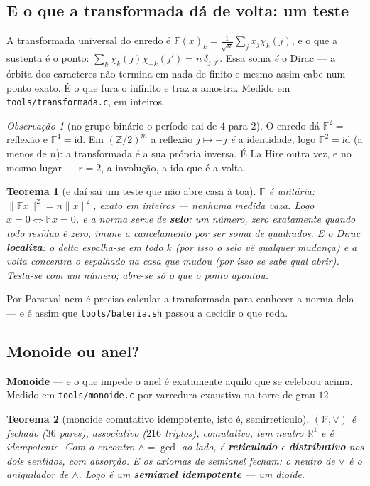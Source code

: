 \documentclass[11pt]{article}
\newcommand{\code}[1]{\texttt{\small #1}}
\newcommand{\Z}{\mathbb Z}
\newcommand{\R}{\mathbb R}
\newcommand{\F}{\mathbb F}
\theoremstyle{plain}
\newtheorem{teorema}{Teorema}
\theoremstyle{remark}
\newtheorem{obs}{Observação}
\begin{document}
\subsection*{E o que a transformada dá de volta: um teste}

A transformada universal do enredo é $\F(x)_k=\frac1{\sqrt n}\sum_j x_j\chi_k(j)$, e o que a sustenta
é o ponto: $\sum_k\chi_k(j)\chi_{-k}(j')=n\,\delta_{j,j'}$. Essa soma \emph{é} o Dirac --- a órbita
dos caracteres não termina em nada de finito e mesmo assim cabe num ponto exato. É o que fura o
infinito e traz a amostra. Medido em \code{tools/transformada.c}, em inteiros.

\begin{obs}[no grupo binário o período cai de $4$ para $2$]
O enredo dá $\F^2=$ reflexão e $\F^4=\mathrm{id}$. Em $(\Z/2)^m$ a reflexão $j\mapsto-j$ \emph{é} a
identidade, logo $\F^2=\mathrm{id}$ (a menos de $n$): a transformada é a sua própria inversa. É La
Hire outra vez, e no mesmo lugar --- $r=2$, a involução, a ida que é a volta.
\end{obs}

\begin{teorema}[e daí sai um teste que não abre casa à toa]
$\F$ é unitária: $\|\F x\|^2=n\|x\|^2$, exato em inteiros --- nenhuma medida vaza. Logo
$x=0\iff\F x=0$, e a norma serve de \textbf{selo}: um número, zero exatamente quando todo resíduo é
zero, imune a cancelamento por ser soma de quadrados. E o Dirac \textbf{localiza}: o delta espalha-se
em todo $k$ (por isso o selo vê qualquer mudança) e a volta concentra o espalhado na casa que mudou
(por isso se sabe qual abrir). \emph{Testa-se com um número; abre-se só o que o ponto apontou.}
\end{teorema}

\noindent Por Parseval nem é preciso calcular a transformada para conhecer a norma dela --- e é assim
que \code{tools/bateria.sh} passou a decidir o que roda.

\subsection{Monoide ou anel?}

\textbf{Monoide} --- e o que impede o anel é exatamente aquilo que se celebrou acima. Medido em
\code{tools/monoide.c} por varredura exaustiva na torre de grau $12$.

\begin{teorema}[monoide comutativo idempotente, isto é, semirretículo]
$(\mathcal V,\vee)$ é fechado ($36$ pares), associativo ($216$ triplos), comutativo, tem neutro
$\R^1$ e é idempotente. Com o encontro $\wedge=\gcd$ ao lado, é \textbf{reticulado} e
\textbf{distributivo} nos dois sentidos, com absorção. E os axiomas de semianel fecham: o neutro de
$\vee$ é o \emph{aniquilador} de $\wedge$. Logo é um \textbf{semianel idempotente} --- um dioide.
\end{teorema}
\end{document}
